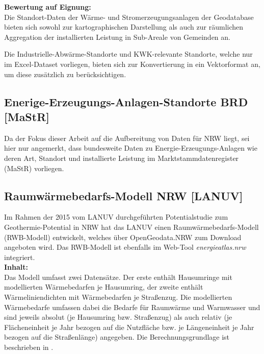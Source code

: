 			\textbf{Bewertung auf Eignung:}\\
			Die Standort-Daten der Wärme- und Stromerzeugungsanlagen der Geodatabase bieten sich sowohl zur kartographischen Darstellung als auch zur räumlichen Aggregation der installierten Leistung in Sub-Areale von Gemeinden an. 
			
			Die Industrielle-Abwärme-Standorte und KWK-relevante Standorte, welche nur im Excel-Dataset vorliegen, bieten sich zur Konvertierung in ein Vektorformat an, um diese zusätzlich zu berücksichtigen. 
		
		
		
		
		\subsection{Enerige-Erzeugungs-Anlagen-Standorte BRD [MaStR]}
			Da der Fokus dieser Arbeit auf die Aufbereitung von Daten für NRW liegt, sei hier nur angemerkt, dass bundesweite Daten zu Energie-Erzeugungs-Anlagen wie deren Art, Standort und installierte Leistung im Marktstammdatenregister (MaStR) vorliegen.  \cite{web_mastr}
			
		\subsection{Raumwärmebedarfs-Modell NRW [LANUV]}
			Im Rahmen der 2015 vom LANUV durchgeführten Potentialstudie zum Geothermie-Potential in NRW hat das LANUV einen Raumwärmebedarfs-Modell (RWB-Modell) entwickelt, welches über OpenGeodata.NRW zum Download angeboten wird. Das RWB-Modell ist ebenfalls im Web-Tool \textit{energieatlas.nrw} integriert. \cite{lanuv_potentialstudie_geothermie} \cite{web_download_opengeodata_nrw} \cite{web_energieatlas} \\
			
			\textbf{Inhalt:}\\
			Das Modell umfasst zwei Datensätze. Der erste enthält Hausumringe mit modellierten Wärmebedarfen je Hausumring, der zweite enthält Wärmeliniendichten mit Wärmebedarfen je Straßenzug. Die modellierten Wärmebedarfe umfassen dabei die Bedarfe für Raumwärme und Warmwasser und sind jeweils absolut (je Hausumring bzw. Straßenzug) als auch relativ (je Flächeneinheit je Jahr bezogen auf die Nutzfläche bzw. je Längeneinheit je Jahr bezogen auf die Straßenlänge) angegeben. Die Berechnungsgrundlage ist beschrieben in \cite{lanuv_potentialstudie_geothermie}.
			
